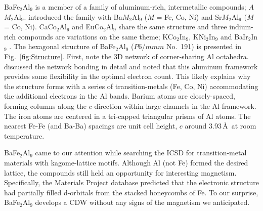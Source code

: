 \documentclass[journal=cmatex,manuscript=article]{achemso}
\begin{document}
\label{sec:Intro_129Family}
BaFe$_2$Al$_9$ is a member of a family of aluminum-rich, intermetallic compounds; $A$$M_2$Al$_9$. \citeauthor{Turban1975_BaFe2Al9-StructureType} introduced the family with Ba$M_2$Al$_9$ ($M$ = Fe, Co, Ni) and Sr$M_2$Al$_9$ ($M$ = Co, Ni).\cite{Turban1975_BaFe2Al9-StructureType} CaCo$_2$Al$_9$ \cite{Manyako1988_Ca-CoNi-Al-System700K} and EuCo$_2$Al$_9$ \cite{Thiede1999_EuCo2Al9} share the same structure and three indium-rich compounds are variations on the same theme; KCo$_2$In$_9$, KNi$_2$In$_9$ \cite{Lei2009_Eu3Co2In15+KCo2Al9+KNi2Al9} and BaIr$_2$In$_9$ \cite{Calta2015_BaIr2In9ThermalExpansion}.
\label{sec:Intro_129Structure}
The hexagonal structure of BaFe$_2$Al$_9$ ($P$6/$mmm$ No.~191) is presented in Fig.~\ref{fig:Structure}.\cite{Turban1975_BaFe2Al9-StructureType} First, note the 3D network of corner-sharing Al octahedra. \citeauthor{Vajenine1998_MagicElectronCountsAeM2Al9} discussed the network bonding in detail and noted that this aluminum framework provides some flexibility in the optimal electron count\cite{Vajenine1998_MagicElectronCountsAeM2Al9}. This likely explains why the structure forms with a series of transition-metals (Fe, Co, Ni) accommodating the additional electrons in the Al bands. Barium atoms are closely-spaced, forming columns along the $c$-direction within large channels in the Al-framework. The iron atoms are centered in a tri-capped triangular prisms of Al atoms. The nearest Fe-Fe (and Ba-Ba) spacings are unit cell height, $c$ around 3.93\,\AA\ at room temperature.

BaFe$_2$Al$_9$ came to our attention while searching the ICSD for transition-metal materials with kagome-lattice motifs.\cite{Bergerhoff1987_ICSD} Although Al (not Fe) formed the desired lattice, the compounds still held an opportunity for interesting magnetism. Specifically, the Materials Project database predicted that the electronic structure had partially filled d-orbitals\cite{Jain2013_MaterialProjectDatabase} from the stacked honeycombs of Fe. To our surprise, BaFe$_2$Al$_9$ develops a CDW without any signs of the magnetism we anticipated. 
\end{document}
